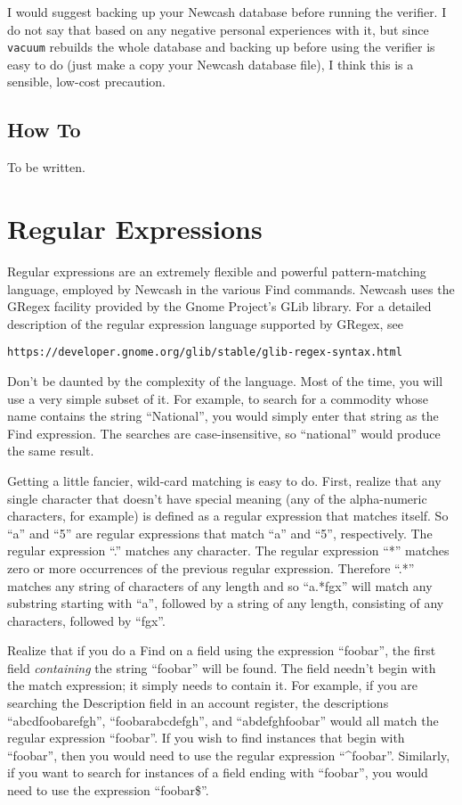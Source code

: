 \documentclass{report}
\begin{document}
I would suggest backing up your Newcash database before running the verifier. I do not say that based on any negative personal experiences with it, but since \verb|vacuum| rebuilds the whole database and backing up before using the verifier is easy to do (just make a copy your Newcash database file), I think this is a sensible, low-cost precaution.
 
\section{How To}
\label{How To}
To be written.

\appendix
\chapter{Regular Expressions}
\label{Regular Expressions}
Regular expressions are an extremely flexible and powerful pattern-matching language, employed by Newcash in the various Find commands. Newcash uses the GRegex facility provided by the Gnome Project's GLib library. For a detailed description of the regular expression language supported by GRegex, see
\begin{verbatim}
https://developer.gnome.org/glib/stable/glib-regex-syntax.html
\end{verbatim}

Don't be daunted by the complexity of the language. Most of the time, you will use a very simple subset of it. For example, to search for a commodity whose name contains the string ``National'', you would simply enter that string as the Find expression. The searches are case-insensitive, so ``national'' would produce the same result.

Getting a little fancier, wild-card matching is easy to do. First, realize that any single character that doesn't have special meaning (any of the alpha-numeric characters, for example) is defined as a regular expression that matches itself. So ``a'' and ``5'' are regular expressions that match ``a'' and ``5'', respectively. The regular expression ``.'' matches any character. The regular expression ``*'' matches zero or more occurrences of the previous regular expression. Therefore ``.*'' matches any string of characters of any length and so ``a.*fgx'' will match any substring starting with ``a'', followed by a string of any length, consisting of any characters, followed by ``fgx''.

Realize that if you do a Find on a field using the expression ``foobar'', the first field \emph{containing} the string ``foobar'' will be found. The field needn't begin with the match expression; it simply needs to contain it. For example, if you are searching the Description field in an account register, the descriptions ``abcdfoobarefgh'', ``foobarabcdefgh'', and ``abdefghfoobar'' would all match the regular expression ``foobar''. If you wish to find instances that begin with ``foobar'', then you would need to use the regular expression ``\^{}foobar''. Similarly, if you want to search for instances of a field ending with ``foobar'', you would need to use the expression ``foobar\$''.
\end{document}

